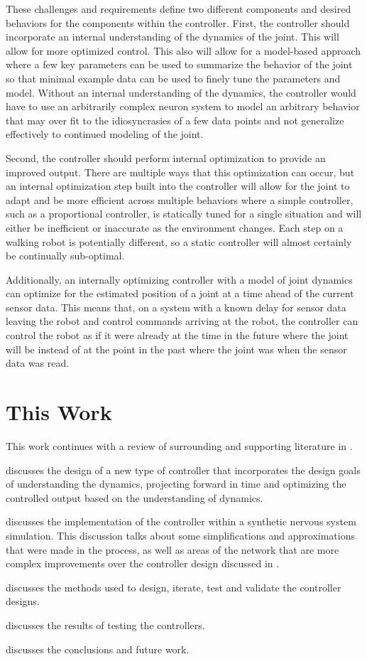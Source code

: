 These challenges and requirements define two different components and desired
behaviors for the components within the controller. First, the controller should
incorporate an internal understanding of the dynamics of the joint. This will
allow for more optimized control. This also will allow for a model-based
approach where a few key parameters can be used to summarize the behavior of the
joint so that minimal example data can be used to finely tune the parameters and
model. Without an internal understanding of the dynamics, the controller would have to
use an arbitrarily complex neuron system to model an arbitrary behavior that may
over fit to the idiosyncrasies of a few data points and not generalize
effectively to continued modeling of the joint.

Second, the controller should perform internal optimization to provide an
improved output. There are multiple ways that this optimization can occur, but
an internal optimization step built into the controller will allow for the joint
to adapt and be more efficient across multiple behaviors where a simple
controller, such as a proportional controller, is statically tuned for a single
situation and will either be inefficient or inaccurate as the environment
changes. Each step on a walking robot is potentially different, so a static
controller will almost certainly be continually sub-optimal.

Additionally, an internally optimizing controller with a model of joint dynamics can
optimize for the estimated position of a joint at a time ahead of the current
sensor data. This means that, on a system with a known delay for sensor data
leaving the robot and control commands arriving at the robot, the controller can
control the robot as if it were already at the time in the future where the
joint will be instead of at the point in the past where the joint was when the
sensor data was read.

\section{This Work}

This work continues with a review of surrounding and supporting literature in
.

discusses the design of a new type 
of controller that incorporates the
design goals of understanding the dynamics, projecting forward in time and
optimizing the controlled output based on the understanding of dynamics.

 discusses the implementation of the controller within 
a synthetic nervous system
simulation. This discussion talks about some simplifications and approximations
that were made in the process, as well as areas of the network that are more
complex improvements over the controller design discussed in .

 discusses the methods used to design, iterate, test and
validate the controller designs.

 discusses the results of testing the controllers.

 discusses the conclusions and future work.
